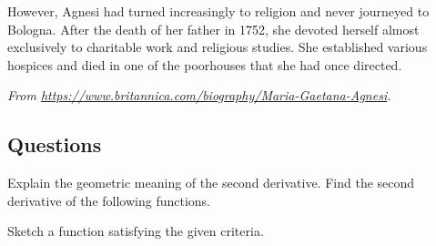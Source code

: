 However, Agnesi had turned increasingly to religion and never journeyed to Bologna. After the death of her father in 1752, she devoted herself almost exclusively to charitable work and religious studies. She established various hospices and died in one of the poorhouses that she had once directed.

\textit{From \url{https://www.britannica.com/biography/Maria-Gaetana-Agnesi}.}

\subsection*{Questions}
\begin{questions}
  \question Explain the geometric meaning of the second derivative.
  \question Find the second derivative of the following functions.
  \question Sketch a function satisfying the given criteria.
\end{questions}

